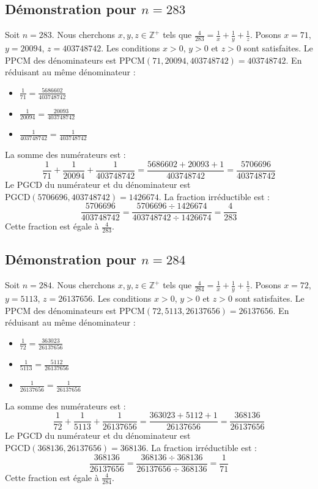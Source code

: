 \documentclass[11pt,a4paper]{article}
\begin{document}
\subsection{Démonstration pour $n = 283$}
Soit $n = 283$. Nous cherchons $x, y, z \in \mathbb{Z}^{+}$ tels que $\frac{4}{283} = \frac{1}{x} + \frac{1}{y} + \frac{1}{z}$.
Posons $x = 71$, $y = 20094$, $z = 403748742$.
Les conditions $x > 0$, $y > 0$ et $z > 0$ sont satisfaites.
Le PPCM des dénominateurs est $\text{PPCM}(71, 20094, 403748742) = 403748742$.
En réduisant au même dénominateur :
\begin{itemize}
    \item $\frac{1}{71} = \frac{5686602}{403748742}$
    \item $\frac{1}{20094} = \frac{20093}{403748742}$
    \item $\frac{1}{403748742} = \frac{1}{403748742}$
\end{itemize}
La somme des numérateurs est :
$$ \frac{1}{71} + \frac{1}{20094} + \frac{1}{403748742} = \frac{5686602 + 20093 + 1}{403748742} = \frac{5706696}{403748742} $$
Le PGCD du numérateur et du dénominateur est $\text{PGCD}(5706696, 403748742) = 1426674$.
La fraction irréductible est :
$$ \frac{5706696}{403748742} = \frac{5706696 \div 1426674}{403748742 \div 1426674} = \frac{4}{283} $$
Cette fraction est égale à $\frac{4}{283}$.

\subsection{Démonstration pour $n = 284$}
Soit $n = 284$. Nous cherchons $x, y, z \in \mathbb{Z}^{+}$ tels que $\frac{4}{284} = \frac{1}{x} + \frac{1}{y} + \frac{1}{z}$.
Posons $x = 72$, $y = 5113$, $z = 26137656$.
Les conditions $x > 0$, $y > 0$ et $z > 0$ sont satisfaites.
Le PPCM des dénominateurs est $\text{PPCM}(72, 5113, 26137656) = 26137656$.
En réduisant au même dénominateur :
\begin{itemize}
    \item $\frac{1}{72} = \frac{363023}{26137656}$
    \item $\frac{1}{5113} = \frac{5112}{26137656}$
    \item $\frac{1}{26137656} = \frac{1}{26137656}$
\end{itemize}
La somme des numérateurs est :
$$ \frac{1}{72} + \frac{1}{5113} + \frac{1}{26137656} = \frac{363023 + 5112 + 1}{26137656} = \frac{368136}{26137656} $$
Le PGCD du numérateur et du dénominateur est $\text{PGCD}(368136, 26137656) = 368136$.
La fraction irréductible est :
$$ \frac{368136}{26137656} = \frac{368136 \div 368136}{26137656 \div 368136} = \frac{1}{71} $$
Cette fraction est égale à $\frac{4}{284}$.
\end{document}
